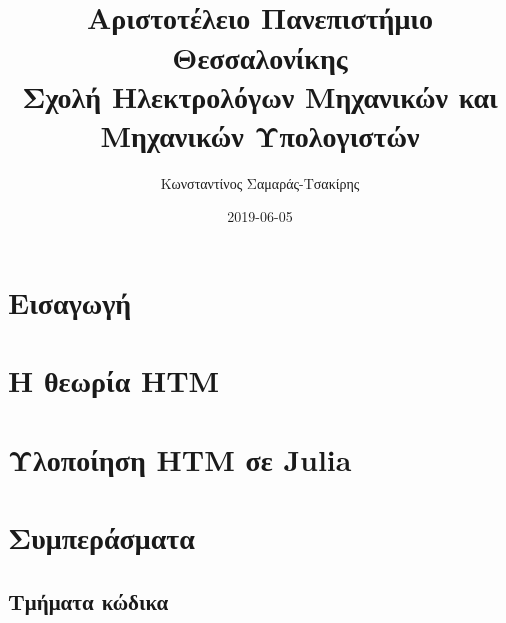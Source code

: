 \documentclass[a4paper,11pt,twoside]{report}
\title{
\titlestring \\
{\large Αριστοτέλειο Πανεπιστήμιο Θεσσαλονίκης}\\
{\large Σχολή Ηλεκτρολόγων Μηχανικών και Μηχανικών Υπολογιστών}
}
\author{Κωνσταντίνος Σαμαράς-Τσακίρης}
\date{2019-06-05}
\begin{document}
\maketitle


\tableofcontents{}

\chapter{Εισαγωγή}


\chapter{Η θεωρία HTM}


\chapter{Υλοποίηση HTM σε Julia}




\chapter{Συμπεράσματα}


\printbibliography

\begin{appendices}
\chapter{Τμήματα κώδικα}

\end{appendices}
\end{document}
